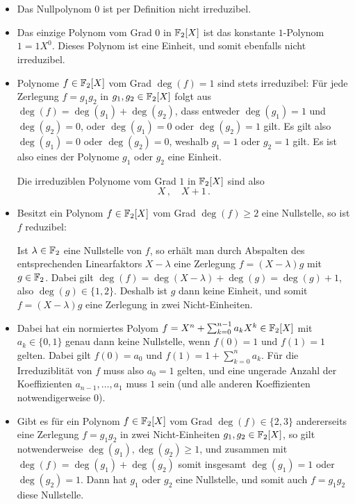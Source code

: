 \section{}





\subsection{}

\begin{itemize}
  \item
    Das Nullpolynom $0$ ist per Definition nicht irreduzibel.
  \item
    Das einzige Polynom vom Grad $0$ in $\mathbb{F}_2[X]$ ist das konstante $1$-Polynom $1 = 1 X^0$.
    Dieses Polynom ist eine Einheit, und somit ebenfalls nicht irreduzibel.
  \item
    Polynome $f \in \mathbb{F}_2[X]$ vom Grad $\deg(f) = 1$ sind stets irreduzibel:
    Für jede Zerlegung $f = g_1 g_2$ in $g_1, g_2 \in \mathbb{F}_2[X]$ folgt aus $\deg(f) = \deg(g_1) + \deg(g_2)$, dass entweder $\deg(g_1) = 1$ und $\deg(g_2) = 0$, oder $\deg(g_1) = 0$ oder $\deg(g_2) = 1$ gilt.
    Es gilt also $\deg(g_1) = 0$ oder $\deg(g_2) = 0$, weshalb $g_1 = 1$ oder $g_2 = 1$ gilt.
    Es ist also eines der Polynome $g_1$ oder $g_2$ eine Einheit.
    
    Die irreduziblen Polynome vom Grad $1$ in $\mathbb{F}_2[X]$ sind also
    \[
      X \,,
      \quad
      X + 1 \,.
    \]

  \item
    Besitzt ein Polynom $f \in \mathbb{F}_2[X]$ vom Grad $\deg(f) \geq 2$ eine Nullstelle, so ist $f$ reduzibel:
    
    Ist $\lambda \in \mathbb{F}_2$ eine Nullstelle von $f$, so erhält man durch Abspalten des entsprechenden Linearfaktors $X - \lambda$ eine Zerlegung $f = (X - \lambda) g$ mit $g \in \mathbb{F}_2$.
    Dabei gilt $\deg(f) = \deg(X-\lambda) + \deg(g) = \deg(g) + 1$, also $\deg(g) \in \{1, 2\}$.
    Deshalb ist $g$ dann keine Einheit, und somit $f = (X-\lambda)g$ eine Zerlegung in zwei Nicht-Einheiten.
  \item
    Dabei hat ein normiertes Polyom $f = X^n + \sum_{k=0}^{n-1} a_k X^k \in \mathbb{F}_2[X]$ mit $a_k \in \{0,1\}$ genau dann keine Nullstelle, wenn $f(0) = 1$ und $f(1) = 1$ gelten.
    Dabei gilt $f(0) = a_0$ und $f(1) = 1 + \sum_{k=0}^n a_k$.
    Für die Irreduziblität von $f$ muss also $a_0 = 1$ gelten, und eine ungerade Anzahl der Koeffizienten $a_{n-1}, \dotsc, a_1$ muss $1$ sein (und alle anderen Koeffizienten notwendigerweise $0$).
  \item
    Gibt es für ein Polynom $f \in \mathbb{F}_2[X]$ vom Grad $\deg(f) \in \{2,3\}$ andererseits eine Zerlegung $f = g_1 g_2$ in zwei Nicht-Einheiten $g_1, g_2 \in \mathbb{F}_2[X]$, so gilt notwenderweise $\deg(g_1), \deg(g_2) \geq 1$, und zusammen mit $\deg(f) = \deg(g_1) + \deg(g_2)$ somit insgesamt $\deg(g_1) = 1$ oder $\deg(g_2) = 1$.
    Dann hat $g_1$ oder $g_2$ eine Nullstelle, und somit auch $f = g_1 g_2$ diese Nullstelle.
    

\end{itemize}
